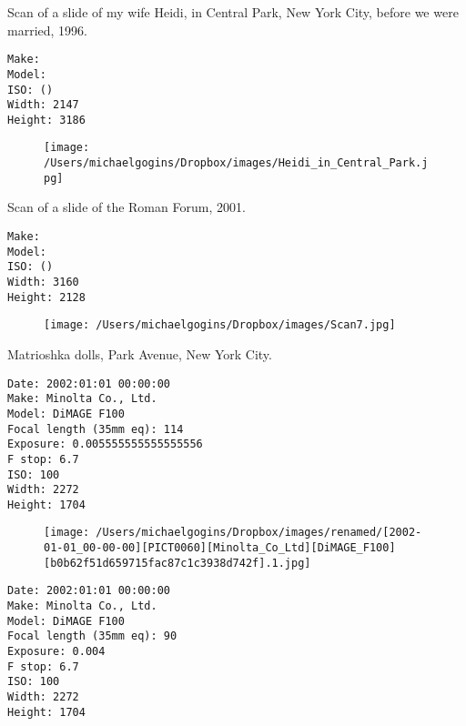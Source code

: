 \documentclass[11pt,letter,DIV=14,paper=landscape]{scrbook}
\begin{document}
\clearpage
\noindent Scan of a slide of my wife Heidi, in Central Park, New York City, before we were married, 1996.
\noindent
\begin{lstlisting}
Make: 
Model: 
ISO: ()
Width: 2147
Height: 3186
\end{lstlisting}
\clearpage

\begin{figure}
\texttt{[image: /Users/michaelgogins/Dropbox/images/Heidi\_in\_Central\_Park.jpg]}
\end{figure}
    
\clearpage

\noindent Scan of a slide of the Roman Forum, 2001.
\noindent
\begin{lstlisting}
Make: 
Model: 
ISO: ()
Width: 3160
Height: 2128
\end{lstlisting}
\clearpage

\begin{figure}
\texttt{[image: /Users/michaelgogins/Dropbox/images/Scan7.jpg]}
\end{figure}
    
\clearpage
\noindent Matrioshka dolls, Park Avenue, New York City.
\noindent
\begin{lstlisting}
Date: 2002:01:01 00:00:00
Make: Minolta Co., Ltd.
Model: DiMAGE F100
Focal length (35mm eq): 114
Exposure: 0.005555555555555556
F stop: 6.7
ISO: 100
Width: 2272
Height: 1704
\end{lstlisting}
\clearpage

\begin{figure}
\texttt{[image: /Users/michaelgogins/Dropbox/images/renamed/[2002-01-01\_00-00-00][PICT0060][Minolta\_Co\_Ltd][DiMAGE\_F100][b0b62f51d659715fac87c1c3938d742f].1.jpg]}
\end{figure}
    
\clearpage
\noindent 
\noindent
\begin{lstlisting}
Date: 2002:01:01 00:00:00
Make: Minolta Co., Ltd.
Model: DiMAGE F100
Focal length (35mm eq): 90
Exposure: 0.004
F stop: 6.7
ISO: 100
Width: 2272
Height: 1704
\end{lstlisting}
\clearpage
\end{document}
